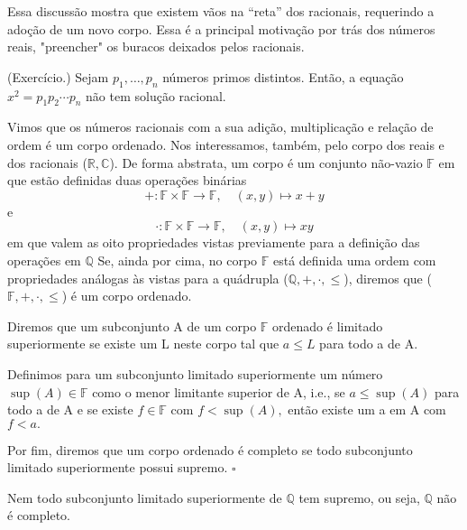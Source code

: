 \documentclass[Analysis/analysis_notes.tex]{subfiles}
\begin{document}
Essa discuss\~ao mostra que existem v\~aos na ``reta'' dos racionais, requerindo a ado\c c\~ao de um novo corpo. Essa \'e a principal
motiva\c c\~ao por tr\'as dos n\'umeros reais, "preencher" os buracos deixados pelos racionais.
\begin{prop*}
	(Exerc\'icio.) Sejam $p_{1}, \ldots, p_{n}$ n\'umeros primos distintos. Ent\~ao, a equa\c c\~ao $x^{2} = p_{1}p_2\cdots p_{n}$ n\~ao
	tem solu\c c\~ao racional.
\end{prop*}
Vimos que os n\'umeros racionais com a sua adi\c c\~ao, multiplica\c c\~ao e rela\c c\~ao de ordem \'e um corpo ordenado. Nos interessamos,
tamb\'em, pelo corpo dos reais e dos racionais ($\mathbb{R}, \mathbb{C}$). De forma abstrata, um corpo \'e um conjunto n\~ao-vazio
$\mathbb{F}$ em que est\~ao definidas duas opera\c c\~oes bin\'arias
$$
	+:\mathbb{F}\times \mathbb{F}\rightarrow \mathbb{F}, \quad (x, y)\mapsto x + y
$$
e
$$
	\cdot: \mathbb{F}\times \mathbb{F}\rightarrow \mathbb{F}, \quad (x, y)\mapsto xy
$$
em que valem as oito propriedades vistas previamente para a defini\c c\~ao das opera\c c\~oes em $\mathbb{Q}$
Se, ainda por cima, no corpo $\mathbb{F}$ est\'a definida uma ordem com propriedades an\'alogas \`as vistas para a qu\'adrupla
($\mathbb{Q}, +, \cdot, \leq{}$), diremos que ($\mathbb{F}, +, \cdot, \leq{}$) \'e um corpo ordenado.
\begin{def*}
	Diremos que um subconjunto A de um corpo $\mathbb{F}$ ordenado \'e limitado superiormente se existe um L neste corpo tal que $a \leq{L}$ para todo
	a de A.

	Definimos para um subconjunto limitado superiormente um n\'umero $\sup(A)\in \mathbb{F}$ como o menor limitante superior de
	A, i.e., se $a \leq{\sup(A)}$ para todo a de A e se existe $f\in \mathbb{F}$ com $f < \sup(A),$ ent\~ao existe um a em A com $ f < a.$

	Por fim, diremos que um corpo ordenado \'e completo se todo subconjunto limitado superiormente possui supremo. $\square$
\end{def*}
Nem todo subconjunto limitado superiormente de $\mathbb{Q}$ tem supremo, ou seja, $\mathbb{Q}$ n\~ao \'e completo.
\end{document}
